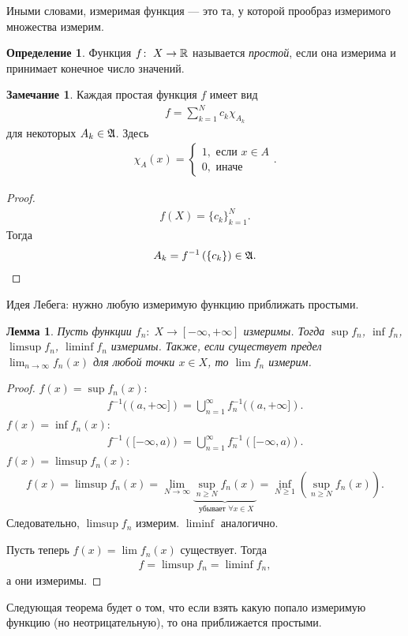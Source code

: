 \documentclass[a4paper,14pt]{extarticle}
\newcounter{theoremCnt}
\theoremstyle{definition}
\newtheorem{df}[theoremCnt]{Определение}
\theoremstyle{plain}
\theoremstyle{plain}
\newtheorem{lm}[theoremCnt]{Лемма}
\theoremstyle{plain}
\theoremstyle{plain}
\theoremstyle{definition}
\theoremstyle{definition}
\newtheorem{remrk}[theoremCnt]{Замечание}
\theoremstyle{definition}
\theoremstyle{definition}
\theoremstyle{definition}
\theoremstyle{definition}
\theoremstyle{plain}
\theoremstyle{plain}
\theoremstyle{plain}
\theoremstyle{plain}
\theoremstyle{definition}
\theoremstyle{definition}
\theoremstyle{definition}
\theoremstyle{definition}
\theoremstyle{definition}
\newcommand{\R}{\ensuremath \mathbb{R}}
\newcommand{\A}{\ensuremath \mathfrak{A}}
\begin{document}
Иными словами, измеримая функция --- это та, у которой прообраз измеримого множества измерим.
\begin{df}
 Функция $f \colon\; X \to \R$ называется \textit{простой}, если она измерима и принимает конечное число значений.
\end{df}
\begin{remrk}
 Каждая простая функция $f$ имеет вид
 \begin{align*}
  f = \sum_{k=1}^{N} c_k \chi_{A_k}
 \end{align*} для некоторых $A_k \in \A$. Здесь
 \begin{align*}
  \chi_A(x) = \begin{cases}
   1, \text{ если } x \in A \\
   0, \text{ иначе }
  \end{cases}
 .\end{align*}
\end{remrk}
\begin{proof}
 \begin{align*}
  f(X) = \{c_{k}\}_{k=1}^{N}
 .\end{align*} Тогда
 \begin{align*}
  A_k = f^{-1} \left( \left\{ c_k \right\} \right) \in \A
 .\end{align*}
\end{proof}
Идея Лебега: нужно любую измеримую функцию приближать простыми.
\begin{lm}
 Пусть функции $f_n \colon\; X \to [-\infty, +\infty]$ измеримы. Тогда $\sup f_n$, $\inf f_n$,  $\limsup f_n$, $\liminf f_n$ измеримы. Также, если существует предел  $\lim_{n \to \infty} f_n(x)$ для любой точки $x \in X$, то $\lim f_n$ измерим.
\end{lm}
\begin{proof}
 $f(x) = \sup f_n(x)$:
 \begin{align*}
  f^{-1}((a, +\infty]) = \bigcup_{n=1}^{\infty} f^{-1}_n( (a, +\infty] )
 .\end{align*} $f(x) = \inf f_n(x)$:
 \begin{align*}
  f^{-1} \left( [-\infty, a) \right) = \bigcup_{n=1}^{\infty} f^{-1}_n \left( [-\infty, a) \right)
 .\end{align*}  $f(x) = \limsup f_n(x)$:
 \begin{align*}
  f(x) = \limsup f_n(x) = \displaystyle\lim_{N \to \infty} \underbrace{\sup_{n \geqslant N} f_n(x)}_{\text{ убывает } \forall x \in X} = \inf_{N \geqslant 1} \left( \sup_{n \geqslant N} f_n(x) \right)
 .\end{align*} Следовательно, $\limsup f_n$ измерим. $\liminf$ аналогично.

 Пусть теперь $f(x) = \lim f_n(x)$ существует. Тогда
 \begin{align*}
  f = \limsup f_n = \liminf f_n
 ,\end{align*} а они измеримы.
\end{proof}

Следующая теорема будет о том, что если взять какую попало измеримую функцию (но неотрицательную), то она приближается простыми.
\end{document}
